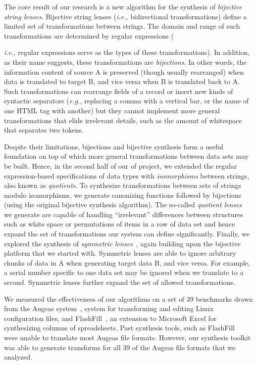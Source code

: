 \documentclass[12pt]{article}
\begin{document}
The core result of our research is a new algorithm for
the synthesis of \emph{bijective string lenses}.  Bijective string lenses (\emph{i.e.,}
bidirectional transformations) define a limited set of
transformations between strings.  The domain and range of such
transformations are determined by regular expressions ({\emph{i.e.,}
  regular expressions serve as the types of these transformations).
 In addition, as their name suggests, these transformations are
 \emph{bijections}.
 In other words, the information content of source A is preserved (though usually
rearranged) when data is translated to target B, and vice versa when B
is translated back to A.  Such transformations can rearrange fields of
a record or insert new kinds of syntactic separators (\emph{e.g.,} replacing a
comma with a vertical bar, or the name of one HTML tag with another)
but they cannot implement more general transformations that elide
irrelevant details, such as the amount of whitespace that separates
two tokens.

Despite their limitations, bijections and bijective synthesis form a
useful foundation on top of which more general transformations between
data sets may be built.  Hence, in the second half of our of project,
we extended the regular expression-based specifications of data types
with \emph{isomorphisms} between strings, also known as
\emph{quotients}.  To synthesize transformations between sets of
strings modulo isomorphisms, we generate canonizing functions followed
by bijections (using the original bijective synthesis algorithm).  The
so-called \emph{quotient lenses}~\cite{quotientlenses} we generate are capable of handling
``irrelevant'' differences between structures such as white space or
permutations of items in a row of data set and hence expand the set of
transformations our system can define significantly.  Finally, we explored the
synthesis of \emph{symmetric lenses}~\cite{symmetric-lenses}, again building upon the
bijective platform that we started with.  Symmetric lenses are able to
ignore arbitrary chunks of data in A when generating target data B,
and vice versa.  For example, a serial number specific to one data set
may be ignored when we translate to a second.  Symmetric lenses
further expand the set of allowed transformations.

We measured the effectiveness of our algorithms on a set of 39
benchmarks drawn from the Augeas system~\cite{augeas},  system for
transforming and editing Linux configuration files, and
FlashFill~\cite{flashfill}, an extension to Microsoft Excel for
synthesizing columns of spreadsheets.  Past synthesis
tools, such as FlashFill~\cite{flashfill} were unable to translate
most Augeas file formats.  However, our synthesis toolkit was able to
generate transforms for all 39 of the Augeas file formats that we analyzed.

}
\end{document}
